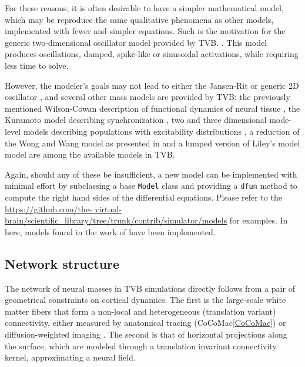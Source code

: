     For these reasons, it is often desirable to have a simpler mathematical 
    model, which may be reproduce the same qualitative phenomena as other 
    models, implemented with fewer and simpler equations. Such is the motivation
    for the generic two-dimensional oscillator model provided by TVB. 
    . This model produces oscillations, damped, spike-like or 
    sinusoidal activations, while requiring less time to solve.

    However, the modeler's goals may not lead to either the Jansen-Rit
    \cite{Jansen_1995, David_2003, David_2004} or generic 2D oscillator
    \cite{FitzHugh_1961, Nagumo_1962}, and several other mass models are
    provided by TVB: the previously mentioned Wilson-Cowan description of
    functional dynamics of neural tissue \cite{Wilson_1972}, the Kuramoto
    model describing synchronization \cite{Kuramoto_1975, Cabral_2011}, two
    and three dimensional mode-level models describing populations with
    excitability distributions \cite{Stefanescu_2011, Stefanescu_2008}, a
    reduction of the Wong and Wang model \cite{Wong_2006} as presented in
    \cite{Deco_2013} and a lumped version of Liley's model \cite{Liley_1999,
    Steyn-Ross_1999} model are among the available models in TVB.

    Again, should any of these be insufficient, a new model can be implemented
    with minimal effort by subclassing a base \texttt{Model} class and
    providing a  \texttt{dfun} method to compute the right hand sides of the
    differential  equations. Please refer to the \url{https://github.com/the-
    virtual-brain/scientific_library/tree/trunk/contrib/simulator/models} for
    examples. In here, models found in the work of \cite{Larter_1999,
    Breakspear_2003, Morris_1981, Hindmarsh_1984, Brunel_2001} have been implemented.

    

\subsection{Network structure}

    The network of neural masses in TVB simulations directly follows from  a
    pair of geometrical constraints on cortical dynamics. The first is the
    large-scale white matter fibers that form a non-local and heterogeneous
    (translation variant) connectivity, either measured by anatomical tracing
    (CoCoMac\ref{CoCoMac}) or diffusion-weighted imaging \cite{Hagmann_2008,
    Honey_2009, Bastiani_2012}. The second is that of horizontal projections
    along the surface, which are modeled through a translation invariant
     connectivity kernel,
    approximating a neural field.

